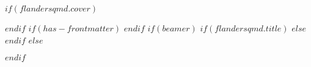 $if(flandersqmd.cover)$

$endif$
$if(has-frontmatter)$
\frontmatter
$endif$
$if(beamer)$
$if(flandersqmd.title)$
\frame{\titlepage}
$else$
$endif$
$else$
\maketitle
$endif$
